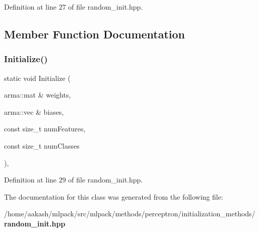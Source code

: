 Definition at line 27 of file random\+\_\+init.\+hpp.



\subsection{Member Function Documentation}
\mbox{\label{classmlpack_1_1perceptron_1_1RandomInitialization_ae4285f008adf2a80d33e3fa1570d86d5}} 
\subsubsection{Initialize()}
{\footnotesize\ttfamily static void Initialize (\begin{DoxyParamCaption}\item[{arma\+::mat \&}]{weights,  }\item[{arma\+::vec \&}]{biases,  }\item[{const size\+\_\+t}]{num\+Features,  }\item[{const size\+\_\+t}]{num\+Classes }\end{DoxyParamCaption})\hspace{0.3cm}{\ttfamily [inline]}, {\ttfamily [static]}}



Definition at line 29 of file random\+\_\+init.\+hpp.



The documentation for this class was generated from the following file\+:\begin{DoxyCompactItemize}
\item 
/home/aakash/mlpack/src/mlpack/methods/perceptron/initialization\+\_\+methods/\textbf{ random\+\_\+init.\+hpp}\end{DoxyCompactItemize}
